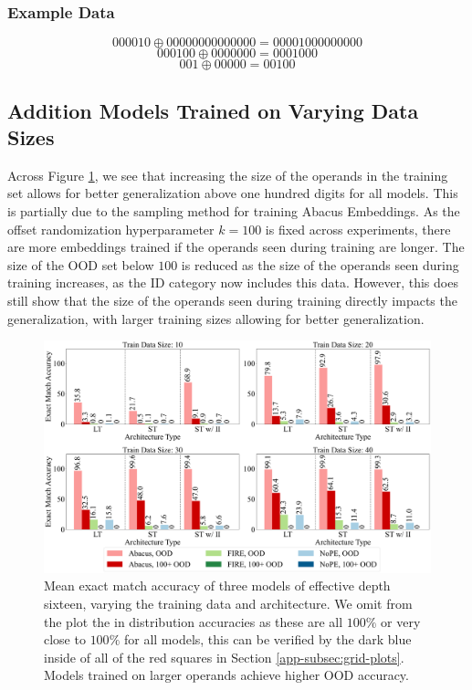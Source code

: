 \documentclass{article}
\begin{document}
\subsubsection{Example Data}
\label{subsubsec:pos-or-examples}
\[000010 \oplus 00000000000000 = 00001000000000\]
\[000100 \oplus 0000000 =0001000\]
\[001 \oplus 00000 = 00100\]

\subsection{Addition Models Trained on Varying Data Sizes}
\label{app-subsec:addition_vary_train_size}
Across Figure \ref{fig:add_depth_16_full}, we see that increasing the size of the operands in the training set allows for better generalization above one hundred digits for all models.
This is partially due to the sampling method for training Abacus Embeddings.
As the offset randomization hyperparameter \(k=100\) is fixed across experiments, there are more embeddings trained if the operands seen during training are longer.
The size of the OOD set below \(100\) is reduced as the size of the operands seen during training increases, as the ID category now includes this data.
However, this does still show that the size of the operands seen during training directly impacts the generalization, with larger training sizes allowing for better generalization.

\begin{figure}[ht!]
    \centering
    \includegraphics[width=\textwidth]{Figures/figure_1_4_2_bars.pdf}
    \caption{
    Mean exact match accuracy of three models of effective depth sixteen, varying the training data and architecture.
    We omit from the plot the in distribution accuracies as these are all \(100\%\) or very close to \(100\%\) for all models, this can be verified by the dark blue inside of all of the red squares in Section \ref{app-subsec:grid-plots}.
    Models trained on larger operands achieve higher OOD accuracy.
    }
    \label{fig:add_depth_16_full}
\end{figure}
\end{document}

